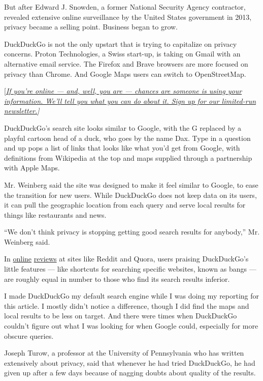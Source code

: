 But after Edward J. Snowden, a former National Security Agency
contractor, revealed extensive online surveillance by the United States
government in 2013, privacy became a selling point. Business began to
grow.

DuckDuckGo is not the only upstart that is trying to capitalize on
privacy concerns. Proton Technologies, a Swiss start-up, is taking on
Gmail with an alternative email service. The Firefox and Brave browsers
are more focused on privacy than Chrome. And Google Maps users can
switch to OpenStreetMap.

{[}\href{https://www.nytimes3xbfgragh.onion/newsletters/privacy-project?action=click\&module=Intentional\&pgtype=Article}{\emph{If
you're online --- and, well, you are --- chances are someone is using
your information. We'll tell you what you can do about it. Sign up for
our limited-run newsletter.}}\emph{{]}}

DuckDuckGo's search site looks similar to Google, with the G replaced by
a playful cartoon head of a duck, who goes by the name Dax. Type in a
question and up pops a list of links that looks like what you'd get from
Google, with definitions from Wikipedia at the top and maps supplied
through a partnership with Apple Maps.

Mr. Weinberg said the site was designed to make it feel similar to
Google, to ease the transition for new users. While DuckDuckGo does not
keep data on its users, it can pull the geographic location from each
query and serve local results for things like restaurants and news.

``We don't think privacy is stopping getting good search results for
anybody,'' Mr. Weinberg said.

In
\href{https://www.reddit.com/r/linux/comments/7rwmgt/do_you_prefer_duckduckgo_over_google_search/}{online}
\href{https://www.quora.com/Is-DuckDuckGo-a-good-search-engine-1}{reviews}
at sites like Reddit and Quora, users praising DuckDuckGo's little
features --- like shortcuts for searching specific websites, known as
bangs --- are roughly equal in number to those who find its search
results inferior.

I made DuckDuckGo my default search engine while I was doing my
reporting for this article. I mostly didn't notice a difference, though
I did find the maps and local results to be less on target. And there
were times when DuckDuckGo couldn't figure out what I was looking for
when Google could, especially for more obscure queries.

Joseph Turow, a professor at the University of Pennsylvania who has
written extensively about privacy, said that whenever he had tried
DuckDuckGo, he had given up after a few days because of nagging doubts
about quality of the results.

